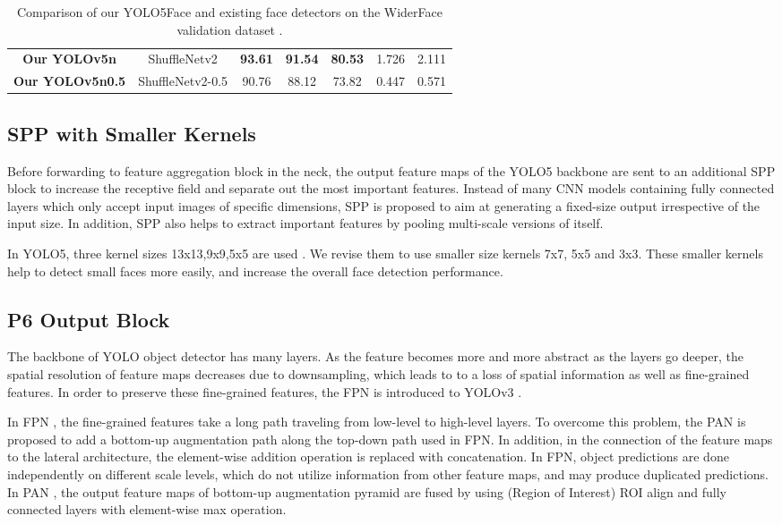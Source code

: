 \documentclass[conference]{IEEEtran}
\begin{document}
\begin{table*}[!htb]
\begin{tabular}{c|c|c|c|c|c|c}
       \textbf{Our YOLOv5n} & ShuffleNetv2 \cite{ShuffleNetv2} & \textbf{93.61} & \textbf{91.54} & \textbf{80.53} & 1.726 & 2.111 \\  
       \textbf{Our YOLOv5n0.5} & ShuffleNetv2-0.5 \cite{ShuffleNetv2} & 90.76&88.12&73.82& 0.447 & 0.571 \\ 
       \hline
       \end{tabular}
    \caption{Comparison of our YOLO5Face and existing face detectors on the WiderFace validation dataset \cite{WiderFace}.}
    \label{t2}
\end{table*}


\subsection{SPP with Smaller Kernels}

Before forwarding to feature aggregation block in the neck, the output feature maps of the YOLO5 backbone are sent to an additional SPP block \cite{SPP} to increase the receptive field and separate out the most important features. Instead of many CNN models containing fully connected layers which only accept input images of specific dimensions, SPP is proposed to aim at generating a fixed-size output irrespective of the input size. In addition, SPP also helps to extract important features by pooling multi-scale versions of itself.  

In YOLO5, three kernel sizes 13x13,9x9,5x5 are used \cite{YOLOv5}. We revise them to use smaller size kernels 7x7, 5x5 and 3x3. These smaller kernels help to detect small faces more easily, and increase the overall face detection performance.     

\subsection{P6 Output Block}

The backbone of YOLO object detector has many layers. As the feature becomes more and more abstract as the layers go deeper, 
the spatial resolution of feature maps decreases due to downsampling, which leads to to a loss of spatial information as well as fine-grained features. In order to preserve these fine-grained features, the FPN \cite{FPN} is introduced to YOLOv3 \cite{YOLOv3}.  

In FPN \cite{FPN}, the fine-grained features take a long path traveling from low-level to high-level layers. To overcome this problem, the PAN is proposed to add a bottom-up augmentation path along the top-down path used in FPN. In addition, in the connection of the feature maps to the lateral architecture, the element-wise addition operation is replaced with concatenation. In FPN, object predictions are done independently on different scale levels, which do not utilize information from other feature maps, and may produce duplicated predictions. In PAN \cite{PAN},  the output feature maps of bottom-up augmentation pyramid are fused by using (Region of Interest) ROI align and fully connected layers with element-wise max operation. 
\end{document}
